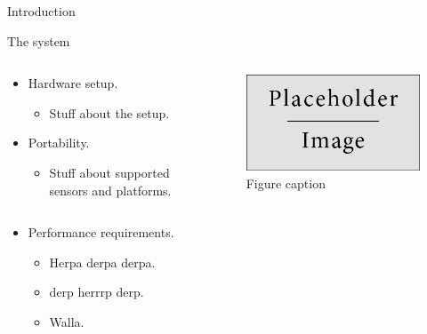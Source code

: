 \documentclass[final,hyperref={pdfpagelabels=false}]{beamer}
\begin{document}
\begin{frame}[t]
\begin{columns}[t]
\begin{column}{.465\textwidth}
\begin{block}{Introduction}
\end{block}


\begin{block}{The system}

\begin{columns} %
\begin{column}{.54\textwidth} %
\begin{itemize}
\item Hardware setup.
\begin{itemize}
\item Stuff about the setup.
\end{itemize}
\item Portability.
\begin{itemize}
\item Stuff about supported sensors and platforms.
\end{itemize}
\end{itemize}
\end{column}

\begin{column}{.43\textwidth} %
\centering
\begin{figure}
\includegraphics[width=0.8\linewidth]{placeholder.jpg}
\caption{Figure caption}
\end{figure}
\end{column}
\end{columns} %

\begin{itemize}
\item Performance requirements.
\begin{itemize}
\item Herpa derpa derpa.
\item derp herrrp derp.
\item Walla.
\end{itemize}
\end{itemize}


\end{block}
\end{column}
\end{columns}
\end{frame}
\end{document}
